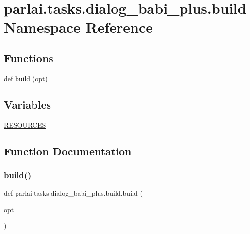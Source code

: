 \hypertarget{namespaceparlai_1_1tasks_1_1dialog__babi__plus_1_1build}{}\section{parlai.\+tasks.\+dialog\+\_\+babi\+\_\+plus.\+build Namespace Reference}
\label{namespaceparlai_1_1tasks_1_1dialog__babi__plus_1_1build}
\subsection*{Functions}
\begin{DoxyCompactItemize}
\item 
def \hyperlink{namespaceparlai_1_1tasks_1_1dialog__babi__plus_1_1build_a744abaf2c667658a3bc25beae9477b94}{build} (opt)
\end{DoxyCompactItemize}
\subsection*{Variables}
\begin{DoxyCompactItemize}
\item 
\hyperlink{namespaceparlai_1_1tasks_1_1dialog__babi__plus_1_1build_afe5f8e77bf50e50d0e281f06d609c856}{R\+E\+S\+O\+U\+R\+C\+ES}
\end{DoxyCompactItemize}


\subsection{Function Documentation}
\mbox{\label{namespaceparlai_1_1tasks_1_1dialog__babi__plus_1_1build_a744abaf2c667658a3bc25beae9477b94}} 
\subsubsection{\texorpdfstring{build()}{build()}}
{\footnotesize\ttfamily def parlai.\+tasks.\+dialog\+\_\+babi\+\_\+plus.\+build.\+build (\begin{DoxyParamCaption}\item[{}]{opt }\end{DoxyParamCaption})}



